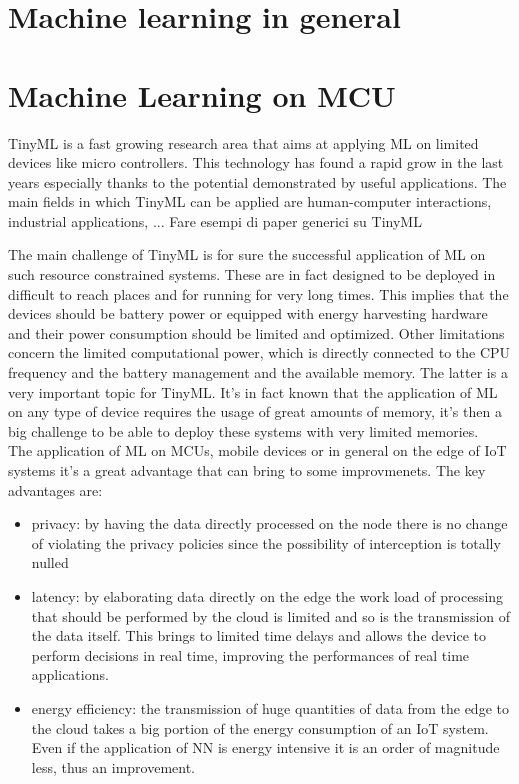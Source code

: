 \documentclass[12pt]{report}
\begin{document}
\section{Machine learning in general}


\section{Machine Learning on MCU}


TinyML is a fast growing research area that aims at applying ML on limited devices like micro controllers. This technology has found a rapid grow in the last years especially thanks to the potential demonstrated by useful applications. The main fields in which TinyML can be applied are human-computer interactions, industrial applications, ... Fare esempi di paper generici su TinyML

The main challenge of TinyML is for sure the successful application of ML on such resource constrained systems. These are in fact designed to be deployed in difficult to reach places and for running for very long times. This implies that the devices should be battery power or equipped with energy harvesting hardware and their power consumption should be limited and optimized. Other limitations concern the limited computational power, which is directly connected to the CPU frequency and the battery management and the available memory. The latter is a very important topic for TinyML. It's in fact known that the application of ML on any type of device requires the usage of great amounts of memory, it's then a big challenge to be able to deploy these systems with very limited memories.\\
The application of ML on MCUs, mobile devices or in general on the edge of IoT systems it's a great advantage that can bring to some improvmenets. The key advantages are:
\begin{itemize}
\item privacy: by having the data directly processed on the node there is no change of violating the privacy policies since the possibility of interception is totally nulled
\item latency: by elaborating data directly on the edge the work load of processing that should be performed by the cloud is limited and so is the transmission of the data itself. This brings to limited time delays and allows the device to perform decisions in real time, improving the performances of real time applications.
\item energy efficiency: the transmission of huge quantities of data from the edge to the cloud takes a big portion of the energy consumption of an IoT system. Even if the application of NN is energy intensive it is an order of magnitude less, thus an improvement.
\end{itemize}
\end{document}
